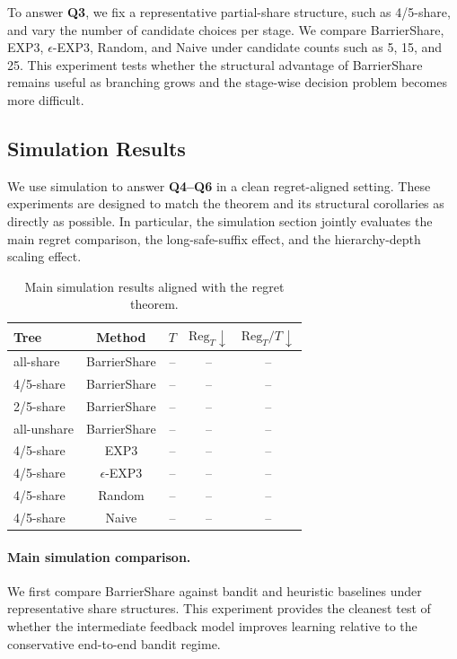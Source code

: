 \documentclass{article}
\begin{document}
To answer \textbf{Q3}, we fix a representative partial-share structure, such as 4/5-share, and vary the number of candidate choices per stage. We compare BarrierShare, EXP3, $\epsilon$-EXP3, Random, and Naive under candidate counts such as 5, 15, and 25. This experiment tests whether the structural advantage of BarrierShare remains useful as branching grows and the stage-wise decision problem becomes more difficult.

\subsection{Simulation Results}

We use simulation to answer \textbf{Q4--Q6} in a clean regret-aligned setting. These experiments are designed to match the theorem and its structural corollaries as directly as possible. In particular, the simulation section jointly evaluates the main regret comparison, the long-safe-suffix effect, and the hierarchy-depth scaling effect.

\begin{table}[t]
    \centering
    \small
    \caption{Main simulation results aligned with the regret theorem.}
    \label{tab:sim_main}
    \begin{tabular}{lcccc}
        \toprule
        Tree & Method & $T$ & $\mathrm{Reg}_T \downarrow$ & $\mathrm{Reg}_T/T \downarrow$ \\
        \midrule
        all-share & BarrierShare & -- & -- & -- \\
        4/5-share & BarrierShare & -- & -- & -- \\
        2/5-share & BarrierShare & -- & -- & -- \\
        all-unshare & BarrierShare & -- & -- & -- \\
        4/5-share & EXP3 & -- & -- & -- \\
        4/5-share & $\epsilon$-EXP3 & -- & -- & -- \\
        4/5-share & Random & -- & -- & -- \\
        4/5-share & Naive & -- & -- & -- \\
        \bottomrule
    \end{tabular}
\end{table}

\paragraph{Main simulation comparison.}
We first compare BarrierShare against bandit and heuristic baselines under representative share structures. This experiment provides the cleanest test of whether the intermediate feedback model improves learning relative to the conservative end-to-end bandit regime.
\end{document}
